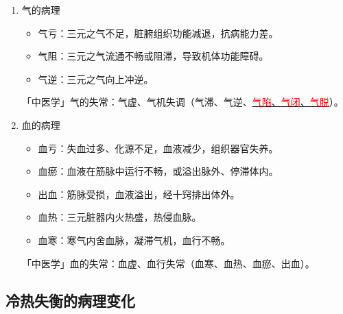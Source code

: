 \documentclass[cn,hazy,blue,12pt,normal,founder]{elegantnote}
\newcommand{\redt}[1]{\textcolor{red}{{}#1}}      %
\begin{document}
\begin{enumerate}
  \item 气的病理
  \begin{itemize}
    \item 气亏：三元之气不足，脏腑组织功能减退，抗病能力差。
    \item 气阻：三元之气流通不畅或阻滞，导致机体功能障碍。
    \item 气逆：三元之气向上冲逆。
  \end{itemize}

  \begin{note}
  「中医学」气的失常：气虚、气机失调（气滞、气逆、\uline{\redt{气陷}、\redt{气闭}、\redt{气脱}}）。
  \end{note}

  \item 血的病理
  \begin{itemize}
    \item 血亏：失血过多、化源不足，血液减少，组织器官失养。
    \item 血瘀：血液在筋脉中运行不畅，或溢出脉外、停滞体内。
    \item 出血：筋脉受损，血液溢出，经十窍排出体外。
    \item 血热：三元脏器内火热盛，热侵血脉。
    \item 血寒：寒气内舍血脉，凝滞气机，血行不畅。
  \end{itemize}

  \begin{note}
  「中医学」血的失常：血虚、血行失常（血寒、血热、血瘀、出血）。
  \end{note}
\end{enumerate}

\subsection{冷热失衡的病理变化}
\end{document}
